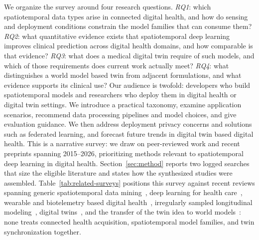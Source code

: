 \documentclass[journal]{IEEEtran}
\begin{document}
We organize the survey around four research questions. \emph{RQ1}: which spatiotemporal data types arise in connected digital health, and how do sensing and deployment conditions constrain the model families that can consume them? \emph{RQ2}: what quantitative evidence exists that spatiotemporal deep learning improves clinical prediction across digital health domains, and how comparable is that evidence? \emph{RQ3}: what does a medical digital twin require of such models, and which of those requirements does current work actually meet? \emph{RQ4}: what distinguishes a world model based twin from adjacent formulations, and what evidence supports its clinical use? Our audience is twofold: developers who build spatiotemporal models and researchers who deploy them in digital health or digital twin settings. We introduce a practical taxonomy, examine application scenarios, recommend data processing pipelines and model choices, and give evaluation guidance. We then address deployment privacy concerns and solutions such as federated learning, and forecast future trends in digital twin based digital health. This is a narrative survey: we draw on peer-reviewed work and recent preprints spanning 2015--2026, prioritizing methods relevant to spatiotemporal deep learning in digital health. Section~\ref{sec:method} reports two logged searches that size the eligible literature and states how the synthesized studies were assembled. Table~\ref{tab:related-surveys} positions this survey against recent reviews spanning generic spatiotemporal data mining~\cite{wang2022deep,atluri2018stdm}, deep learning for health care~\cite{miotto2018deeplearning}, wearable and biotelemetry based digital health~\cite{Busnatu2022}, irregularly sampled longitudinal modeling~\cite{shukla2021irregular}, digital twins~\cite{Wang2023Survey,Sel2025VVUQ}, and the transfer of the twin idea to world models~\cite{Zheng2026DTtoWM}: none treats connected health acquisition, spatiotemporal model families, and twin synchronization together.
\end{document}
